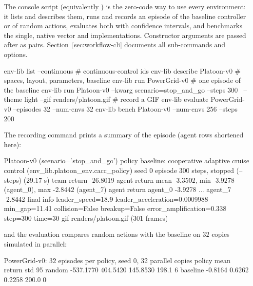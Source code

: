 The console script  (equivalently ) is
the zero-code way to use every environment: it lists and describes them, runs
and records an episode of the baseline controller or of random actions,
evaluates both with confidence intervals, and benchmarks the single, native
vector and  implementations. Constructor arguments are
passed after  as  pairs.
Section~\ref{sec:workflow-cli} documents all sub-commands and options.

\begin{shellcode}
env-lib list --continuous                  # continuous-control ids
env-lib describe Platoon-v0                # spaces, layout, parameters, baseline
env-lib run PowerGrid-v0                   # one episode of the baseline
env-lib run Platoon-v0 --kwarg scenario=stop_and_go --steps 300 \
    --theme light --gif renders/platoon.gif  # record a GIF
env-lib evaluate PowerGrid-v0 --episodes 32 --num-envs 32
env-lib bench Platoon-v0 --num-envs 256 --steps 200
\end{shellcode}

The recording command prints a summary of the episode (agent rows shortened
here):

\begin{textcode}
Platoon-v0 (scenario='stop_and_go')
  policy        baseline: cooperative adaptive cruise control (env_lib.platoon_env.cacc_policy)
  seed          0
  episode       300 steps, stopped (--steps) (29.17 s)
  team return   -26.8019
  agent return  mean -3.3502, min -3.9278 (agent_0), max -2.8442 (agent_7)
    agent     return
    agent_0  -3.9278
    ...
    agent_7  -2.8442
  final info    leader_speed=18.9  leader_acceleration=0.0009988  min_gap=11.41  collision=False  breakup=False  error_amplification=0.338  step=300  time=30
  gif           renders/platoon.gif (301 frames)
\end{textcode}

and the evaluation compares random actions with the baseline on 32 copies
simulated in parallel:

\begin{textcode}
PowerGrid-v0: 32 episodes per policy, seed 0, 32 parallel copies
policy    mean return       std  95%
random      -537.1770  404.5420   145.8530   198.1          6%
baseline      -0.8164    0.6262     0.2258   200.0          0%
\end{textcode}

